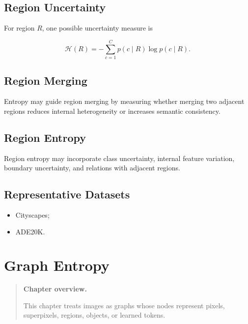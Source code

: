\documentclass[11pt,oneside]{book}
\theoremstyle{remark}
\newcommand{\Entropy}{\mathcal{H}}
\newenvironment{chapteroverview}
{
	\begin{quote}
		\small
		\textbf{Chapter overview.}
	}
	{
	\end{quote}
}
\newenvironment{datasetlist}
{
	\begin{itemize}[label=\(\triangleright\)]
	}
	{
	\end{itemize}
}
\begin{document}
	\section{Region Uncertainty}
	
	For region \(R\), one possible uncertainty measure is
	
	\[
	\Entropy(R)
	=
	-\sum_{c=1}^{C}
	p(c\mid R)\log p(c\mid R).
	\]
	
	\section{Region Merging}
	
	Entropy may guide region merging by measuring whether merging two adjacent
	regions reduces internal heterogeneity or increases semantic consistency.
	
	\section{Region Entropy}
	
	Region entropy may incorporate class uncertainty, internal feature variation,
	boundary uncertainty, and relations with adjacent regions.
	
	\section*{Representative Datasets}
	
	\begin{datasetlist}
		\item Cityscapes;
		\item ADE20K.
	\end{datasetlist}
	
	
	\chapter{Graph Entropy}
	\label{chap:graph-entropy}
	
	\begin{chapteroverview}
		This chapter treats images as graphs whose nodes represent pixels,
		superpixels, regions, objects, or learned tokens.
	\end{chapteroverview}
	
\end{document}

